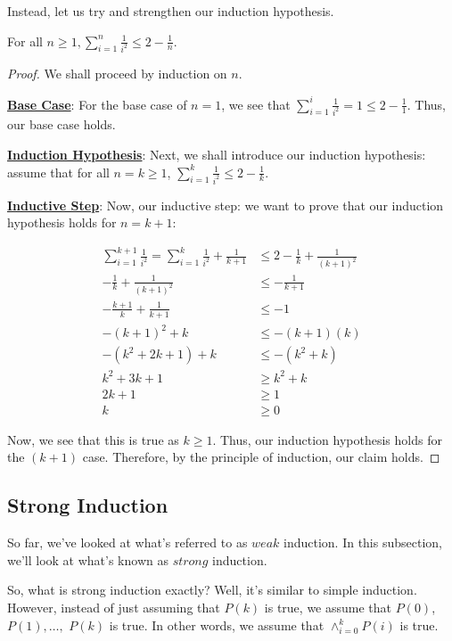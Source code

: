 \documentclass[openany]{book}
\let\oldsum\sum
\renewcommand{\sum}[2]{\oldsum\limits_{#1}^{#2}}
\begin{document}
Instead, let us try and strengthen our induction hypothesis.

\begin{theorem}
	For all $n\geq1, \sum{i=1}{n}\frac{1}{i^2}\leq2-\frac{1}{n}$.
\end{theorem}
\begin{proof}
	We shall proceed by induction on $n$.
	
	\textbf{\underline{Base Case}}: For the base case of $n=1$, we see that $\sum{i=1}{i}\frac{1}{i^2}=1\leq2-\frac{1}{1}$. Thus, our base case holds.
	
	\textbf{\underline{Induction Hypothesis}}: Next, we shall introduce our induction hypothesis: assume that for all $n=k\geq1$, $\sum{i=1}{k}\frac{1}{i^2}\leq2-\frac{1}{k}$.
	
	\textbf{\underline{Inductive Step}}: Now, our inductive step: we want to prove that our induction hypothesis holds for $n=k+1$:
	
	\begin{align*}
		\sum{i=1}{k+1}\frac{1}{i^2}=\sum{i=1}{k}\frac{1}{i^2}+\frac{1}{k+1} &\leq 2 - \frac{1}{k} + \frac{1}{(k+1)^2} \\
		-\frac{1}{k}+\frac{1}{(k+1)^2} &\leq -\frac{1}{k+1} \\
		-\frac{k+1}{k}+\frac{1}{k+1}&\leq-1 \\
		-(k+1)^2 + k &\leq -(k+1)(k) \\
		-(k^2+2k+1)+k &\leq -(k^2+k) \\
		k^2 + 3k + 1 &\geq k^2+k \\
		2k + 1 &\geq 1 \\
		k &\geq 0
	\end{align*}
	
	Now, we see that this is true as $k\geq1$. Thus, our induction hypothesis holds for the $(k+1)$ case. Therefore, by the principle of induction, our claim holds.
\end{proof}

\subsection{Strong Induction} So far, we've looked at what's referred to as $\textit{weak}$ induction. In this subsection, we'll look at what's known as $\textit{strong}$ induction.

So, what is strong induction exactly? Well, it's similar to simple induction. However, instead of just assuming that $P(k)$ is true, we assume that $P(0)$, $P(1),\ldots,$ $P(k)$ is true. In other words, we assume that $\land_{i=0}^k P(i)$ is true.
\end{document}
